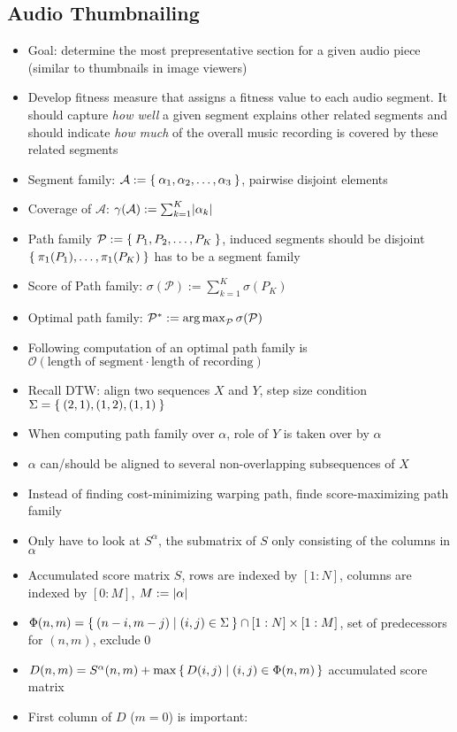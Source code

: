 \subsection{Audio Thumbnailing}
\begin{itemize}
	\item
		Goal: determine the most prepresentative section for a given audio piece (similar to thumbnails in image viewers)
	\item
		Develop fitness measure that assigns a fitness value to each audio segment. It should capture \textit{how well} a given segment explains other related segments and should indicate \textit{how much} of the overall music recording is covered by these related segments
	\item
		Segment family: $\mathcal{A} := \Set{\alpha_1, \alpha_2, \dots , \alpha_3}$, pairwise disjoint elements
	\item
		Coverage of $\mathcal{A}$: $\gamma(\mathcal{A}) := \sum_{k=1}^K \lvert\alpha_k\rvert$
	\item
		Path family $\mathcal{P} := \Set{P_1, P_2, \dots, P_K}$, induced segments should be disjoint $\Set{\pi_1(P_1), \dots, \pi_1(P_K)}$ has to be a segment family
	\item
		Score of Path family: $\sigma(\mathcal{P}):= \sum_{k=1}^K \sigma(P_K)$
	\item
		Optimal path family: $\mathcal{P}^* := \operatorname*{arg\,max}_{\mathcal{P}} \sigma(\mathcal{P})$
	\item
		Following computation of an optimal path family is $\mathcal{O}(\text{length of segment} \cdot \text{length of recording})$
	\item
		Recall DTW: align two sequences $X$ and $Y$, step size condition $\Sigma = \Set{(2,1), (1,2), (1,1)}$
	\item
		When computing path family over $\alpha$, role of $Y$ is taken over by $\alpha$
	\item
		$\alpha$ can/should be aligned to several non-overlapping subsequences of $X$
	\item
		Instead of finding cost-minimizing warping path, finde score-maximizing path family
	\item
		Only have to look at $S^\alpha$, the submatrix of $S$ only consisting of the columns in $\alpha$
	\item
		Accumulated score matrix $S$, rows are indexed by $[1:N]$, columns are indexed by $[0:M]$, $M:= \lvert\alpha\rvert$
	\item
		$\Phi(n,m) = \Set{(n-i, m-j) | (i,j) \in \Sigma} \cap [1:N] \times [1:M]$, set of predecessors for $(n,m)$, exclude 0
	\item
		$D(n,m) = S^\alpha(n,m) + \max \set{D(i,j) | (i,j) \in \Phi(n,m)}$  accumulated score matrix
	\item
		First column of $D$ ($m= 0$) is important:


\end{itemize}
